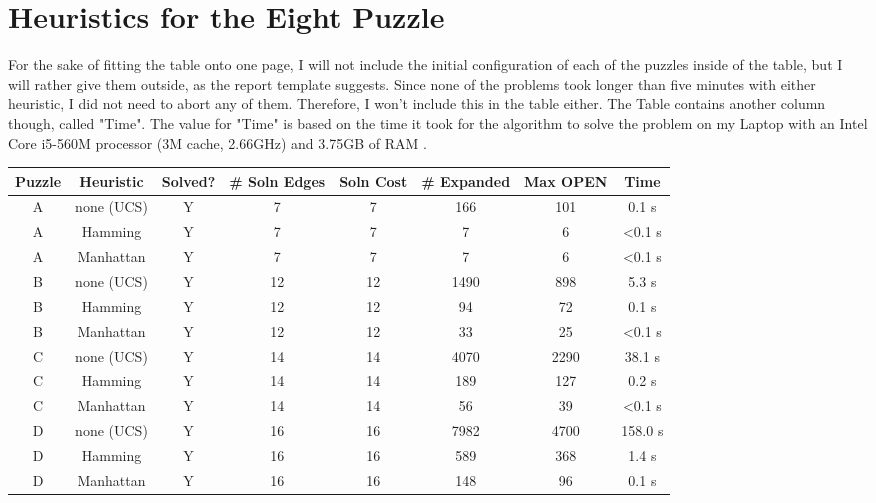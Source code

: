 \section{Heuristics for the Eight Puzzle} \label{sec:heuristics8}

For the sake of fitting the table onto one page, I will not include the initial configuration of each of the puzzles
inside of the table, but I will rather give them outside, as the report template suggests.
Since none of the problems took longer than five minutes with either heuristic, I did not need to abort any of them.
Therefore, I won't include this in the table either.
The Table contains another column though, called "Time".
The value for "Time" is based on the time it took for the algorithm to solve the problem on my Laptop with an Intel
Core i5-560M processor (3\;M cache, 2.66\;GHz) and 3.75\;GB of RAM .


\begin{table}[h]
    \centering
    \begin{tabular}{|c|c|c|c|c|c|c|c|}
        \hline
        Puzzle  & Heuristic   & Solved? & \# Soln Edges & Soln Cost & \# Expanded   & Max OPEN  & Time\\
        \hline
        A   & none (UCS) &   Y   &       7      &     7    &     166    &   101  &   0.1 s  \\
        A   & Hamming    &   Y   &       7      &     7    &       7    &     6  & \textless 0.1 s  \\
        A   & Manhattan  &   Y   &       7      &     7    &       7    &     6  & \textless 0.1 s  \\
        \hline
        B   & none (UCS) &   Y   &      12      &    12    &    1490    &   898  &   5.3 s  \\
        B   & Hamming    &   Y   &      12      &    12    &      94    &    72  &   0.1 s  \\
        B   & Manhattan  &   Y   &      12      &    12    &      33    &    25  & \textless 0.1 s  \\
        \hline
        C   & none (UCS) &   Y   &      14      &    14    &    4070    &  2290  &  38.1 s  \\
        C   & Hamming    &   Y   &      14      &    14    &     189    &   127  &   0.2 s  \\
        C   & Manhattan  &   Y   &      14      &    14    &      56    &    39  & \textless 0.1 s  \\
        \hline
        D   & none (UCS) &   Y   &      16      &    16    &    7982    &  4700  & 158.0 s  \\
        D   & Hamming    &   Y   &      16      &    16    &     589    &   368  &   1.4 s  \\
        D   & Manhattan  &   Y   &      16      &    16    &     148    &    96  &   0.1 s  \\
        \hline
    \end{tabular}
    \label{tab:heuristics8}
\end{table}

